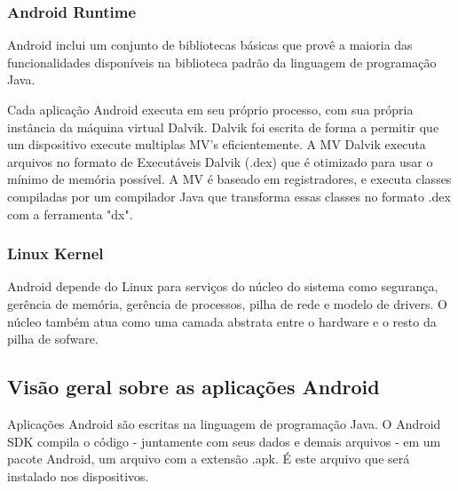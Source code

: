 \subsubsection{Android Runtime}

Android inclui um conjunto de bibliotecas básicas que provê a maioria das funcionalidades
disponíveis na biblioteca padrão da linguagem de programação Java.

Cada aplicação Android executa em seu próprio processo, com sua própria instância 
da máquina virtual Dalvik. Dalvik foi escrita de forma a permitir que um dispositivo
execute multiplas MV's eficientemente. A MV Dalvik executa arquivos no formato de 
Executáveis Dalvik (.dex) que é otimizado para usar o mínimo de memória possível. 
A MV é baseado em registradores, e executa classes compiladas por um compilador Java 
que transforma essas classes no formato .dex com a ferramenta "dx".

\subsubsection{Linux Kernel}

Android depende do Linux para serviços do núcleo do sistema como segurança, gerência
de memória, gerência de processos, pilha de rede e modelo de drivers. O núcleo também
atua como uma camada abstrata entre o hardware e o resto da pilha de sofware.

\subsection{Visão geral sobre as aplicações Android}

Aplicações Android são escritas na linguagem de programação Java. O Android SDK
compila o código - juntamente com seus dados e demais arquivos - em um pacote 
Android, um arquivo com a extensão .apk. É este arquivo que será instalado nos 
dispositivos.


